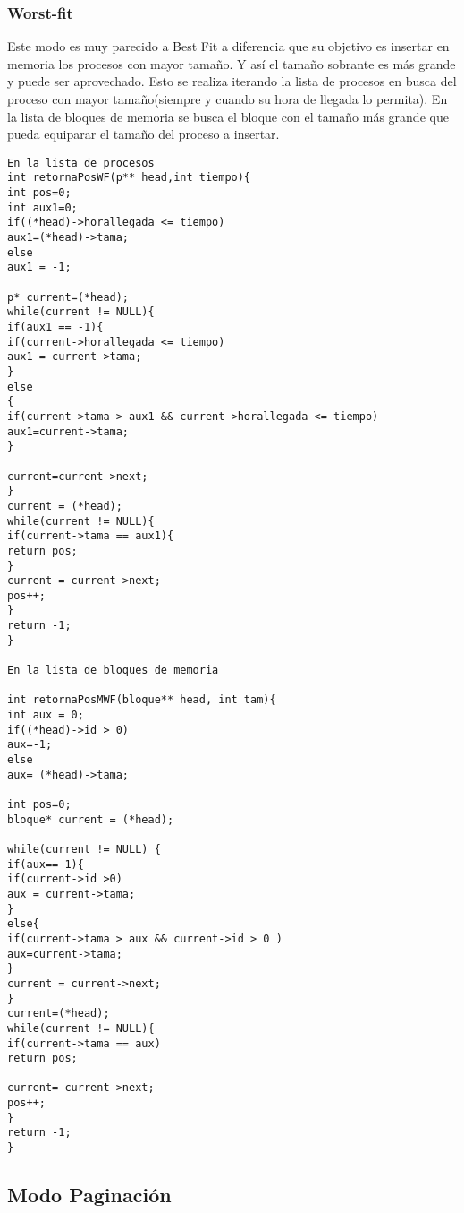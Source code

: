 \documentclass[10pt,a4paper]{article}
\begin{document}
\subsubsection{Worst-fit}
Este modo es muy parecido a Best Fit a diferencia que su objetivo es insertar en memoria los procesos con mayor tamaño. Y así el tamaño sobrante es más grande y puede ser aprovechado.
Esto se realiza iterando la lista de procesos en busca del proceso con mayor tamaño(siempre y cuando su hora de llegada lo permita).
En la lista de bloques de memoria se busca el bloque con el tamaño más grande que pueda equiparar el tamaño del proceso a insertar.
\begin{verbatim}
En la lista de procesos
int retornaPosWF(p** head,int tiempo){
int pos=0;
int aux1=0;
if((*head)->horallegada <= tiempo)
aux1=(*head)->tama;
else 
aux1 = -1;

p* current=(*head);
while(current != NULL){
if(aux1 == -1){
if(current->horallegada <= tiempo)
aux1 = current->tama;
}
else
{
if(current->tama > aux1 && current->horallegada <= tiempo)
aux1=current->tama;
}

current=current->next;
}
current = (*head);
while(current != NULL){
if(current->tama == aux1){
return pos;
}
current = current->next;
pos++;
}
return -1;
}

En la lista de bloques de memoria

int retornaPosMWF(bloque** head, int tam){
int aux = 0;
if((*head)->id > 0)
aux=-1;
else 
aux= (*head)->tama;

int pos=0;
bloque* current = (*head);

while(current != NULL) {
if(aux==-1){
if(current->id >0)
aux = current->tama;
}
else{
if(current->tama > aux && current->id > 0 )
aux=current->tama;
}
current = current->next;
}
current=(*head);
while(current != NULL){
if(current->tama == aux)
return pos;

current= current->next;
pos++;
}
return -1;
}  
\end{verbatim}

\subsection{Modo Paginación}
\end{document}
